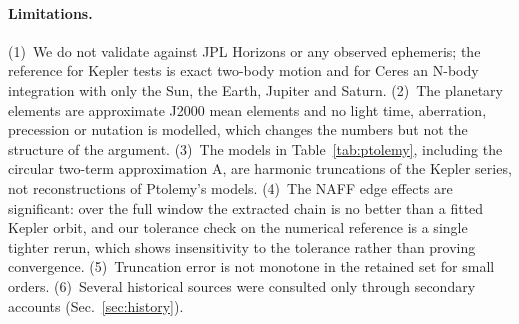 \paragraph*{Limitations.}
(1)~We do not validate against JPL Horizons or any observed ephemeris; the
reference for Kepler tests is exact two-body motion and for Ceres an
N-body integration with only the Sun, the Earth, Jupiter and Saturn.
(2)~The planetary elements are approximate J2000 mean elements and no light
time, aberration, precession or nutation is modelled, which changes the
numbers but not the structure of the argument. (3)~The models in
Table~\ref{tab:ptolemy}, including the circular two-term approximation A, are harmonic truncations of the Kepler series, not
reconstructions of Ptolemy's models. (4)~The NAFF edge effects are
significant: over the full window the extracted chain is no better than a
fitted Kepler orbit, and our tolerance check on the numerical reference is a single tighter rerun, which shows insensitivity to the tolerance rather than proving convergence. (5)~Truncation error is not monotone in the retained set
for small orders. (6)~Several historical sources were consulted only through
secondary accounts (Sec.~\ref{sec:history}).
